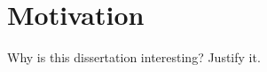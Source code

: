 \section{Motivation}
\label{sec:intro:motivation}

Why is this dissertation interesting? Justify it.

